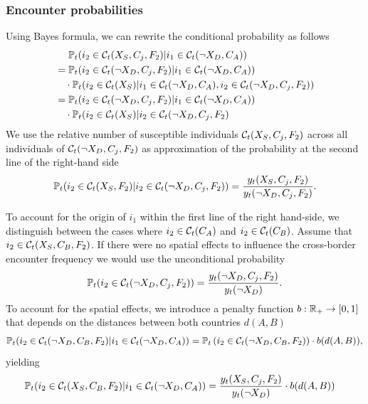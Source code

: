 \subsubsection{Encounter probabilities}
\label{A:meeting_prob}
Using Bayes formula, we can rewrite the conditional probability as follows
\begin{align}
\label{eq:cond_meeting_prob}
&\quad \   \mathbb{P}_t(i_2 \in \mathcal{C}_t(X_S, C_j, F_2)|i_1 \in \mathcal{C}_t(\neg X_D, C_A)) \\ &= \mathbb{P}_t(i_2 \in \mathcal{C}_t(\neg X_D, C_j, F_2) | i_1 \in \mathcal{C}_t(\neg X_D, C_A) )  \notag \\
& \quad \cdot \mathbb{P}_t(i_2 \in \mathcal{C}_t(X_S) | i_1 \in \mathcal{C}_t(\neg X_D, C_A), i_2 \in \mathcal{C}_t(\neg X_D, C_j, F_2) ) \notag \\
&= \mathbb{P}_t(i_2 \in \mathcal{C}_t(\neg X_D, C_j, F_2) | i_1 \in \mathcal{C}_t(\neg X_D, C_A) )  \notag \\
& \quad \cdot \mathbb{P}_t(i_2 \in \mathcal{C}_t(X_S)|i_2 \in \mathcal{C}_t(\neg X_D, C_j, F_2)  \notag
\end{align} 
We use the relative number of susceptible individuals $\mathcal{C}_t(X_S, C_j, F_2)$ across all individuals of $\mathcal{C}_t(\neg X_D, C_j, F_2)$ as approximation of the probability at the second line of the right-hand side 
\begin{align}
 \mathbb{P}_t(i_2 \in \mathcal{C}_t(X_S, F_2)|i_2 \in \mathcal{C}_t(\neg X_D, C_j, F_2) ) = \frac{y_t(X_S, C_j, F_2)}{y_t(\neg X_D, C_j, F_2)}.
\end{align}

To account for the origin of $i_1$ within the first line of the right hand-side, we distinguish between the cases where $i_2 \in \mathcal{C}_t(C_A)$ and $i_2 \in \mathcal{C}_t(C_B)$. Assume that $i_2 \in \mathcal{C}_t(X_S, C_B, F_2)$. If there were no spatial effects to influence the cross-border encounter frequency we would use the unconditional probability 
\begin{align}
\mathbb{P}_t(i_2 \in \mathcal{C}_t(\neg X_D, C_j, F_2)) = \frac{y_t(\neg X_D, C_j, F_2)}{ y_t(\neg X_D)}.   
\end{align}
To account for the spatial effects, we introduce a penalty function $b: \mathbb{R}_+ \to [0,1]$ that depends on the distances between both countries $d(A, B)$
\begin{align}
\label{eq:prob_cross_border}
\mathbb{P}_t(i_2 \in \mathcal{C}_t(\neg X_D, C_B, F_2) | i_1 \in \mathcal{C}_t(\neg X_D, C_A) ) = \mathbb{P}_t\left(i_2 \in \mathcal{C}_t(\neg X_D, C_B, F_2)\right) \cdot b(d(A, B)),
\end{align}
yielding
\begin{align}
\label{eq:cond_meeting_prob_b}
\mathbb{P}_t(i_2 \in \mathcal{C}_t(X_S, C_B, F_2)|i_1 \in \mathcal{C}_t(\neg X_D, C_A)) &= \frac{y_t(X_S, C_j, F_2)}{y_t(\neg X_D)} \cdot b(d(A, B))
\end{align} 


